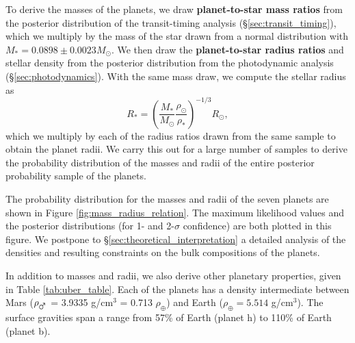 \documentclass[twocolumn]{aastex63}
\begin{document}
To derive the masses of the planets, we draw \textbf{planet-to-star mass ratios} from the posterior distribution of the transit-timing analysis (\S \ref{sec:transit_timing}), which we multiply by the mass of the star drawn from a normal distribution with $M_* = 0.0898{\pm}0.0023 M_\odot$. We then draw the \textbf{planet-to-star radius ratios} and stellar density from the posterior distribution from the photodynamic analysis (\S \ref{sec:photodynamics}).
With the same mass draw, we compute the stellar radius as
\begin{equation}
    R_* = \left(\frac{M_*}{M_\odot}\frac{\rho_\odot}{\rho_*}\right)^{-1/3} R_\odot,
\end{equation}
which we multiply by each of the radius ratios drawn from the same sample to obtain the planet radii.   We carry this out for a large number of samples to derive the probability distribution of the masses and radii of the entire posterior probability sample of the planets.

The probability distribution for the masses and radii of the seven planets are shown in Figure \ref{fig:mass_radius_relation}.  The maximum likelihood values and the posterior distributions (for 1- and 2-$\sigma$ confidence) are both plotted in this figure.  We postpone to \S\ref{sec:theoretical_interpretation} a detailed analysis of the densities and resulting constraints on the bulk compositions of the planets.

In addition to masses and radii, we also derive other planetary properties,
given in Table \ref{tab:uber_table}.  Each of the planets has a density
intermediate between Mars ($\rho_{\mars}$ = 3.9335 g/cm$^3$ = 0.713 $\rho_\oplus$) and
Earth ($\rho_\oplus = 5.514$ g/cm$^3$).  The surface gravities span a range
from 57\% of Earth (planet h) to 110\% of Earth (planet b).
\end{document}
